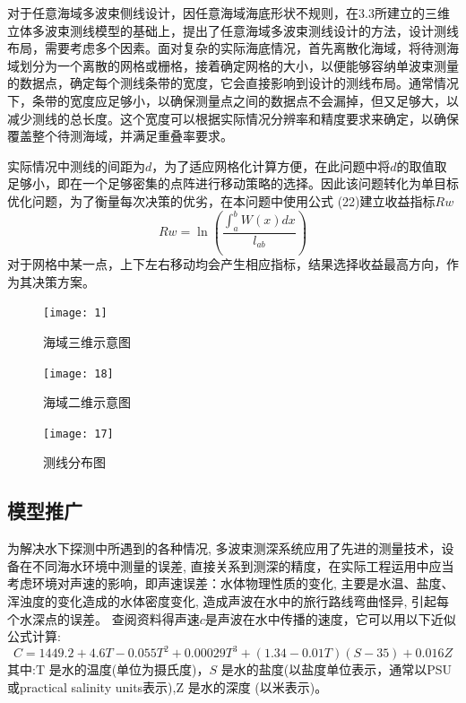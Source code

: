 \documentclass[11pt,twoside,a4paper]{article}
\begin{document}
对于任意海域多波束侧线设计，因任意海域海底形状不规则，在3.3所建立的三维立体多波束测线模型的基础上，提出了任意海域多波束测线设计的方法，设计测线布局，需要考虑多个因素。面对复杂的实际海底情况，首先离散化海域，将待测海域划分为一个离散的网格或栅格，接着确定网格的大小，以便能够容纳单波束测量的数据点，确定每个测线条带的宽度，它会直接影响到设计的测线布局。通常情况下，条带的宽度应足够小，以确保测量点之间的数据点不会漏掉，但又足够大，以减少测线的总长度。这个宽度可以根据实际情况分辨率和精度要求来确定，以确保覆盖整个待测海域，并满足重叠率要求。 

实际情况中测线的间距为$d$，为了适应网格化计算方便，在此问题中将$d$的取值取足够小，即在一个足够密集的点阵进行移动策略的选择。因此该问题转化为单目标优化问题，为了衡量每次决策的优劣，在本问题中使用公式 (22)建立收益指标$Rw$
\begin{equation}
Rw=\ln (\frac{\int_a^b W(x) d x}{l_{ab}})
\end{equation}
对于网格中某一点，上下左右移动均会产生相应指标，结果选择收益最高方向，作为其决策方案。


\begin{figure}[h]
	\centering
	\texttt{[image: 1]}
	\caption{海域三维示意图}
	
\end{figure}

\begin{figure}[h]
	\centering
	\texttt{[image: 18]}
	\caption{海域二维示意图}
	\end{figure}

\begin{figure}[h]
	\centering
	\texttt{[image: 17]}
	\caption{测线分布图}
	\end{figure}




\subsection{模型推广}
为解决水下探测中所遇到的各种情况, 多波束测深系统应用了先进的测量技术，设备在不同海水环境中测量的误差, 直接关系到测深的精度，在实际工程运用中应当考虑环境对声速的影响，即声速误差：水体物理性质的变化, 主要是水温、盐度、浑浊度的变化造成的水体密度变化, 造成声波在水中的旅行路线弯曲怪异, 引起每个水深点的误差。
查阅资料得声速$c$是声波在水中传播的速度，它可以用以下近似公式计算:
\begin{equation}
	C=1449.2+4.6 T-0.055 T^2+0.00029 T^3+(1.34-0.01 T)(S-35)+0.016 Z
\end{equation}
其中:$\mathrm{T}$ 是水的温度(单位为摄氏度)，$S$ 是水的盐度(以盐度单位表示，通常以PSU或practical salinity units表示),$\mathrm{Z}$ 是水的深度 (以米表示)。
\end{document}

